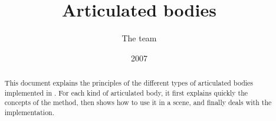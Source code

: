 \documentclass[a4paper,11pt]{article}
\title{Articulated bodies}
\author{The \sofa{} team}
\date{2007}
\begin{document}
 
\maketitle

\begin{abstract}
This document explains the principles of the different types of articulated bodies implemented in \sofa.
For each kind of articulated body, it first explains quickly the concepts of the method, then shows how to use it in a scene, and finally deals with the implementation.
\end{abstract}

\tableofcontents
\newpage

\end{document}
